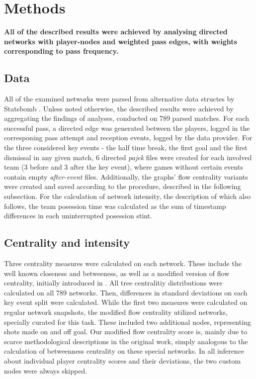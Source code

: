 \documentclass[9pt,twocolumn,twoside]{pnas-report}
\begin{document}
{\small\section*{Methods}

{\bf All of the described results were achieved by analysing directed networks with player-nodes and weighted pass edges, with weights corresponding to pass frequency.} 

\subsection*{Data}
All of the examined networks were parsed from alternative data structes by Statsbomb \cite{statsbomb}. Unless noted otherwise, the described results were achieved by aggregating the findings of analyses, conducted on 789 parsed matches. For each successful pass, a directed edge was generated between the players, logged in the corresponing pass attempt and reception events, logged by the data provider. For the three considered key events - the half time break, the first goal and the first dismissal in any given match, 6 directed \textit{pajek} files were created for each involved team (3 before and 3 after the key event), where games without certain events contain empty \textit{after-event} files. Additionally, the graphs' flow centrality variants were created and saved according to the procedure, described in the following subsection. For the calculation of network intensity, the description of which also follows, the team posession time was calculated as  the sum of timestamp differences in each uninterrupted posession stint.

\subsection*{Centrality and intensity}
Three centrality measures were calculated on each network. These include the well known closeness and betweeness, as well as a modified version of flow centrality, initially introduced in \cite{duch2010quantifying}. All tree centralitiy distributions were calculated on all 789 networks. Then, differences in standard deviations on each key event split were calculated. While the first two measures were calculated on regular network snapshots, the modified flow centrality utilized networks, specially curated for this task. These included two additional nodes, representing shots made on and off goal. Our modified flow centrality score is, mainly due to scarce methodological descriptions in the original work, simply analogous to the calculation of betweenness centrality on these special networks. In all inference about individual player centrality scores and their deviations, the two custom nodes were always skipped.

}
\end{document}
